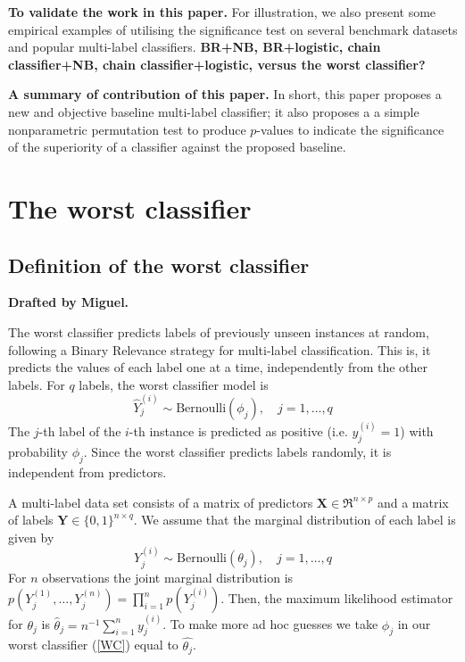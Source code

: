 \documentclass[review]{elsarticle}
\begin{document}
{\bf To validate the work in this paper.}
For illustration, we also present some empirical examples of utilising the significance test on several benchmark datasets and popular multi-label classifiers. {\bf BR+NB, BR+logistic, chain classifier+NB, chain classifier+logistic, versus the worst classifier?}

{\bf A summary of contribution of this paper.}
In short, this paper proposes a new and objective baseline multi-label classifier; it also proposes a a simple nonparametric permutation test to produce $p$-values to indicate the significance of the superiority of a classifier against the proposed baseline.  


\section{The worst classifier}\label{s:worst}

\subsection{Definition of the worst classifier}\label{ss:def}

{\bf Drafted by Miguel.}

The worst classifier predicts labels of previously unseen instances at random, following a Binary Relevance strategy for multi-label classification. This is, it predicts the values of each label one at a time, independently from the other labels. For $q$ labels, the worst classifier model is
\begin{equation}\label{WC}
\hat{Y}^{(i)}_{j} \sim \mathrm{Bernoulli}(\phi_{j}), \quad j = 1,\ldots,q 
\end{equation}
The $j$-th label of the $i$-th instance is predicted as positive (i.e. $y^{(i)}_{j}=1$) with probability $\phi_{j}$. Since the worst classifier predicts labels randomly, it is independent from predictors.

A multi-label data set consists of a matrix of predictors $\mathbf{X} \in \Re^{n \times p}$ and a matrix of labels $\mathbf{Y} \in \{ 0,1 \}^{n \times q}$. We assume that the marginal distribution of each label is given by 
\begin{equation}
Y^{(i)}_{j} \sim \mathrm{Bernoulli}(\theta_{j}), \quad j = 1,\ldots,q 
\end{equation}
For $n$ observations the joint marginal distribution is $p(Y^{(1)}_{j},\ldots,Y^{(n)}_{j}) = \prod^{n}_{i=1}{p(Y^{(i)}_{j})}$. Then, the maximum likelihood estimator for $\theta_{j}$ is $\hat{\theta}_{j} = n^{-1} \sum^{n}_{i=1}{y^{(i)}_{j}}$. To make more ad hoc guesses we take $\phi_{j}$ in our worst classifier (\ref{WC}) equal to $\hat{\theta_{j}}$.
\end{document}
